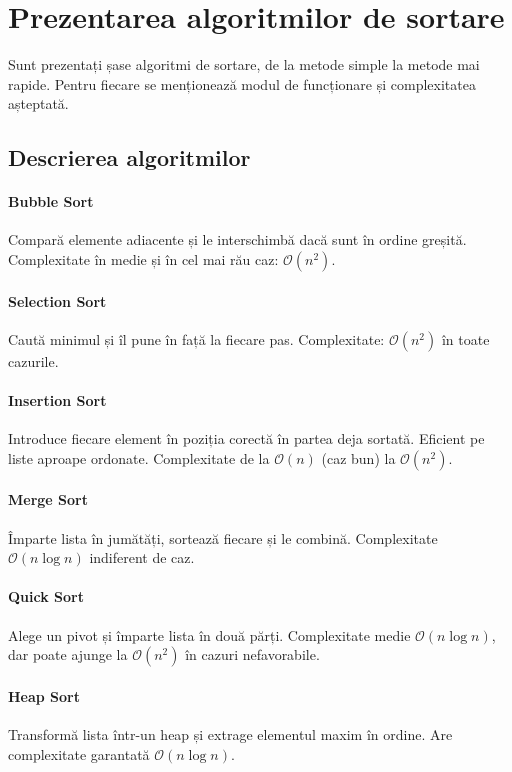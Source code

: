 \documentclass{article}
\begin{document}
\section{Prezentarea algoritmilor de sortare}
Sunt prezentați șase algoritmi de sortare, de la metode simple la metode mai rapide. Pentru fiecare se menționează modul de funcționare și complexitatea așteptată.

\subsection{Descrierea algoritmilor}
\paragraph*{Bubble Sort}
Compară elemente adiacente și le interschimbă dacă sunt în ordine greșită. Complexitate în medie și în cel mai rău caz: $\mathcal{O}(n^2)$.

\paragraph*{Selection Sort}
Caută minimul și îl pune în față la fiecare pas. Complexitate: $\mathcal{O}(n^2)$ în toate cazurile.

\paragraph*{Insertion Sort}
Introduce fiecare element în poziția corectă în partea deja sortată. Eficient pe liste aproape ordonate. Complexitate de la $\mathcal{O}(n)$ (caz bun) la $\mathcal{O}(n^2)$.

\paragraph*{Merge Sort}
Împarte lista în jumătăți, sortează fiecare și le combină. Complexitate $\mathcal{O}(n\log n)$ indiferent de caz.

\paragraph*{Quick Sort}
Alege un pivot și împarte lista în două părți. Complexitate medie $\mathcal{O}(n\log n)$, dar poate ajunge la $\mathcal{O}(n^2)$ în cazuri nefavorabile.

\paragraph*{Heap Sort}
Transformă lista într-un heap și extrage elementul maxim în ordine. Are complexitate garantată $\mathcal{O}(n\log n)$.
\end{document}
